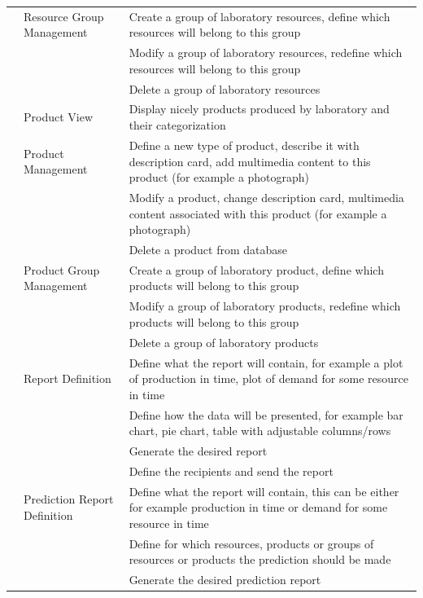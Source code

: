 \documentclass[a4paper,11pt,twoside]{report}
\theoremstyle{definition}
\begin{document}
\begin{longtable}{|p{3cm}|p{3cm}|p{10cm}|}
\texttt{} & Resource Group Management & Create a group of laboratory resources, define which resources will belong to this group\\ \cline{3-3}
\texttt{} & & Modify a group of laboratory resources, redefine which resources will belong to this group\\ \cline{3-3}
\texttt{} & & Delete a group of laboratory resources\\ \cline{2-3}
\texttt{} & Product View & Display nicely products produced by laboratory and their categorization\\ \cline{2-3}
\texttt{} & Product Management & Define a new type of product, describe it with description card, add multimedia content to this product (for example a photograph)\\ \cline{3-3}
\texttt{} & & Modify a product, change description card, multimedia content associated with this product (for example a photograph)\\ \cline{3-3}
\texttt{} & & Delete a product from database\\ \cline{2-3}
\texttt{} & Product Group Management & Create a group of laboratory product, define which products will belong to this group\\ \cline{3-3}
\texttt{} & & Modify a group of laboratory products, redefine which products will belong to this group\\ \cline{3-3}
\texttt{} & & Delete a group of laboratory products\\ \cline{2-3}

\texttt{} & Report Definition & Define what the report will contain, for example a plot of production in time, plot of demand for some resource in time\\ \cline{3-3}
\texttt{} &  & Define how the data will be presented, for example bar chart, pie chart, table with adjustable columns/rows \\ \cline{3-3}
\texttt{} &  & Generate the desired report \\ \cline{3-3}
\texttt{} &  & Define the recipients and send the report \\ \cline{2-3}
\texttt{} & Prediction Report Definition & Define what the report will contain, this can be either for example production in time or demand for some resource in time\\ \cline{3-3}
\texttt{} &  & Define for which resources, products or groups of resources or products the prediction should be made\\ \cline{3-3}
\texttt{} &  & Generate the desired prediction report \\ \cline{3-3}




\end{longtable}
\end{document}
